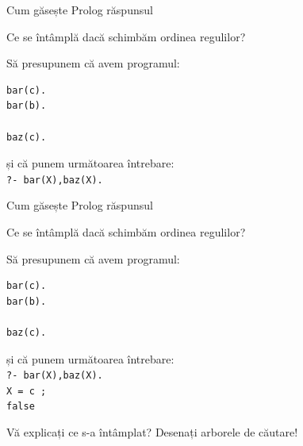 \documentclass[xcolor=x11names,compress,10pt]{beamer}
\begin{document}

\begin{frame}[fragile]{Cum găsește Prolog răspunsul}

\medskip
Ce se întâmplă dacă schimbăm ordinea regulilor?

\medskip
\begin{example}
\begin{multicols}{2}
Să presupunem că avem programul: 
\begin{verbatim}
bar(c). 
bar(b). 

baz(c).
\end{verbatim}
și că punem următoarea întrebare: \\
{\color{blue}\texttt{?- bar(X),baz(X).}}
\columnbreak
\vspace*{0.3cm}
\end{multicols}
\end{example}
\medskip


\end{frame}


\addtocounter{framenumber}{-1}

\begin{frame}[fragile]{Cum găsește Prolog răspunsul}

\medskip
Ce se întâmplă dacă schimbăm ordinea regulilor?

\medskip
\begin{example}

Să presupunem că avem programul: 
\begin{verbatim}
bar(c). 
bar(b). 

baz(c).
\end{verbatim}
și că punem următoarea întrebare: \\
{\color{blue}\texttt{?- bar(X),baz(X).}}\\
{\color{blue}\texttt{X = c ;}}\\
{\color{red}\texttt{false}}

\end{example}
\medskip

Vă explicați ce s-a întâmplat? Desenați arborele de căutare!

\end{frame}
\end{document}
